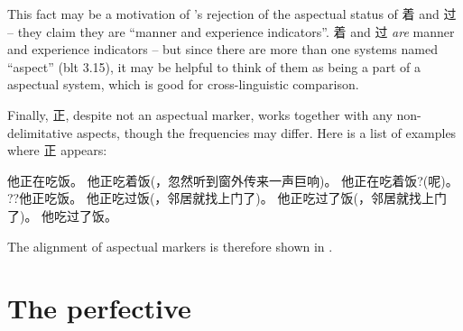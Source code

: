 This fact may be a motivation of \citet[]{li1989mandarin}'s 
rejection of the aspectual status of 着 and 过 --
they claim they are ``manner and experience indicators''.
着 and 过 \emph{are} manner and experience indicators -- 
but since there are more than one systems named ``aspect'' (\ac{blt} 3.15), 
it may be helpful to think of them as being a part of a aspectual system, 
which is good for cross-linguistic comparison.

Finally, 正, despite not an aspectual marker, works together with any non-delimitative aspects,
though the frequencies may differ.
Here is a list of examples where 正 appears:
\begin{exe}
    \ex \begin{xlist}
        \ex 他正在吃饭。
        \ex 他正吃着饭(，忽然听到窗外传来一声巨响)。
        \ex 他正在吃着饭?(呢)。
        \ex ??他正吃饭。
        \ex 他正吃过饭(，邻居就找上门了)。
        \ex 他正吃过了饭(，邻居就找上门了)。
        \ex 他吃过了饭。
    \end{xlist}
\end{exe}

The alignment of aspectual markers is therefore shown in .

\section{The perfective }



